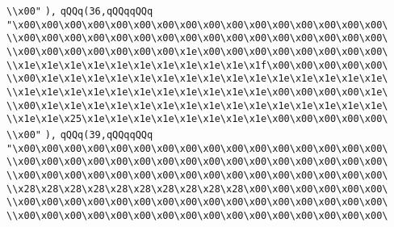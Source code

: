 \verb|\\x00"|\newline
\verb|),|\newline
\verb|qQQq(36,qQQqqQQq|\newline
\verb|"\x00\x00\x00\x00\x00\x00\x00\x00\x00\x00\x00\x00\x00\x00\x00\x00\|\newline
\verb|\\x00\x00\x00\x00\x00\x00\x00\x00\x00\x00\x00\x00\x00\x00\x00\x00\|\newline
\verb|\\x00\x00\x00\x00\x00\x00\x00\x1e\x00\x00\x00\x00\x00\x00\x00\x00\|\newline
\verb|\\x1e\x1e\x1e\x1e\x1e\x1e\x1e\x1e\x1e\x1e\x1f\x00\x00\x00\x00\x00\|\newline
\verb|\\x00\x1e\x1e\x1e\x1e\x1e\x1e\x1e\x1e\x1e\x1e\x1e\x1e\x1e\x1e\x1e\|\newline
\verb|\\x1e\x1e\x1e\x1e\x1e\x1e\x1e\x1e\x1e\x1e\x1e\x00\x00\x00\x00\x1e\|\newline
\verb|\\x00\x1e\x1e\x1e\x1e\x1e\x1e\x1e\x1e\x1e\x1e\x1e\x1e\x1e\x1e\x1e\|\newline
\verb|\\x1e\x1e\x25\x1e\x1e\x1e\x1e\x1e\x1e\x1e\x1e\x00\x00\x00\x00\x00\|\newline
\verb|\\x00"|\newline
\verb|),|\newline
\verb|qQQq(39,qQQqqQQq|\newline
\verb|"\x00\x00\x00\x00\x00\x00\x00\x00\x00\x00\x00\x00\x00\x00\x00\x00\|\newline
\verb|\\x00\x00\x00\x00\x00\x00\x00\x00\x00\x00\x00\x00\x00\x00\x00\x00\|\newline
\verb|\\x00\x00\x00\x00\x00\x00\x00\x00\x00\x00\x00\x00\x00\x00\x00\x00\|\newline
\verb|\\x28\x28\x28\x28\x28\x28\x28\x28\x28\x28\x00\x00\x00\x00\x00\x00\|\newline
\verb|\\x00\x00\x00\x00\x00\x00\x00\x00\x00\x00\x00\x00\x00\x00\x00\x00\|\newline
\verb|\\x00\x00\x00\x00\x00\x00\x00\x00\x00\x00\x00\x00\x00\x00\x00\x00\|\newline
